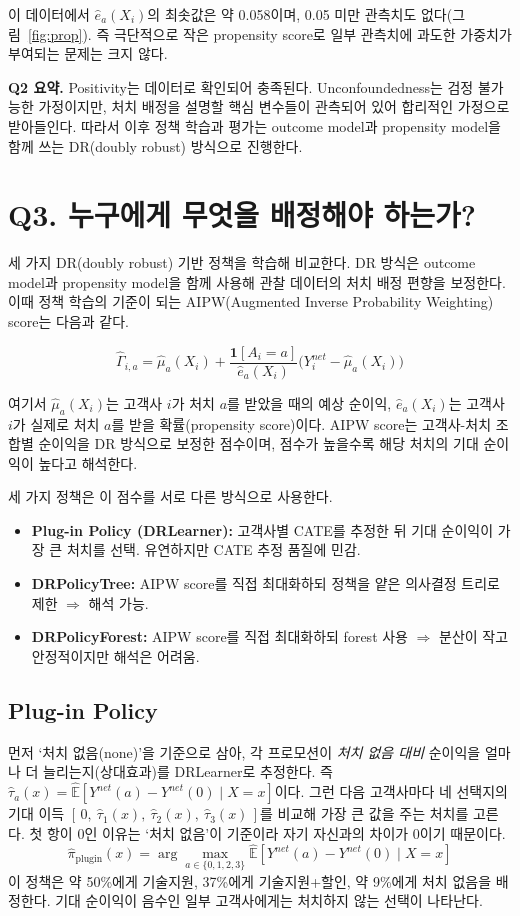 \documentclass[11pt]{article}
\begin{document}
이 데이터에서 $\hat e_a(X_i)$의 최솟값은 약 0.058이며, 0.05 미만 관측치도 없다(그림~\ref{fig:prop}). 즉 극단적으로 작은 propensity score로 일부 관측치에 과도한 가중치가 부여되는 문제는 크지 않다.

\textbf{Q2 요약.} Positivity는 데이터로 확인되어 충족된다. Unconfoundedness는 검정 불가능한 가정이지만, 처치 배정을 설명할 핵심 변수들이 관측되어 있어 합리적인 가정으로 받아들인다. 따라서 이후 정책 학습과 평가는 outcome model과 propensity model을 함께 쓰는 DR(doubly robust) 방식으로 진행한다.

\section{Q3. 누구에게 무엇을 배정해야 하는가?}

세 가지 DR(doubly robust) 기반 정책을 학습해 비교한다. DR 방식은 outcome model과 propensity model을 함께 사용해 관찰 데이터의 처치 배정 편향을 보정한다. 이때 정책 학습의 기준이 되는 AIPW(Augmented Inverse Probability Weighting) score는 다음과 같다.

\[
\hat\Gamma_{i,a} = \hat\mu_a(X_i) + \frac{\mathbf{1}[A_i=a]}{\hat e_a(X_i)}\bigl(Y_i^{net} - \hat\mu_a(X_i)\bigr)
\]

여기서 $\hat\mu_a(X_i)$는 고객사 $i$가 처치 $a$를 받았을 때의 예상 순이익, $\hat e_a(X_i)$는 고객사 $i$가 실제로 처치 $a$를 받을 확률(propensity score)이다. AIPW score는 고객사-처치 조합별 순이익을 DR 방식으로 보정한 점수이며, 점수가 높을수록 해당 처치의 기대 순이익이 높다고 해석한다.

세 가지 정책은 이 점수를 서로 다른 방식으로 사용한다.

\begin{itemize}[leftmargin=1.4em, itemsep=2pt]
  \item \textbf{Plug-in Policy (DRLearner):} 고객사별 CATE를 추정한 뒤 기대 순이익이 가장 큰 처치를 선택. 유연하지만 CATE 추정 품질에 민감.
  \item \textbf{DRPolicyTree:} AIPW score를 직접 최대화하되 정책을 얕은 의사결정 트리로 제한 $\Rightarrow$ 해석 가능.
  \item \textbf{DRPolicyForest:} AIPW score를 직접 최대화하되 forest 사용 $\Rightarrow$ 분산이 작고 안정적이지만 해석은 어려움.
\end{itemize}

\subsection{Plug-in Policy}
먼저 `처치 없음(none)'을 기준으로 삼아, 각 프로모션이 \emph{처치 없음 대비} 순이익을 얼마나 더 늘리는지(상대효과)를 DRLearner로 추정한다. 즉 $\hat\tau_a(x) = \widehat{\mathbb{E}}[Y^{net}(a) - Y^{net}(0)\mid X=x]$이다. 그런 다음 고객사마다 네 선택지의 기대 이득 $[\,0,\ \hat\tau_1(x),\ \hat\tau_2(x),\ \hat\tau_3(x)\,]$를 비교해 가장 큰 값을 주는 처치를 고른다. 첫 항이 0인 이유는 `처치 없음'이 기준이라 자기 자신과의 차이가 0이기 때문이다.
\[
\hat\pi_{\text{plugin}}(x) = \arg\max_{a \in \{0,1,2,3\}} \widehat{\mathbb{E}}[Y^{net}(a) - Y^{net}(0)\mid X=x]
\]
이 정책은 약 50\%에게 기술지원, 37\%에게 기술지원+할인, 약 9\%에게 처치 없음을 배정한다. 기대 순이익이 음수인 일부 고객사에게는 처치하지 않는 선택이 나타난다.
\end{document}
